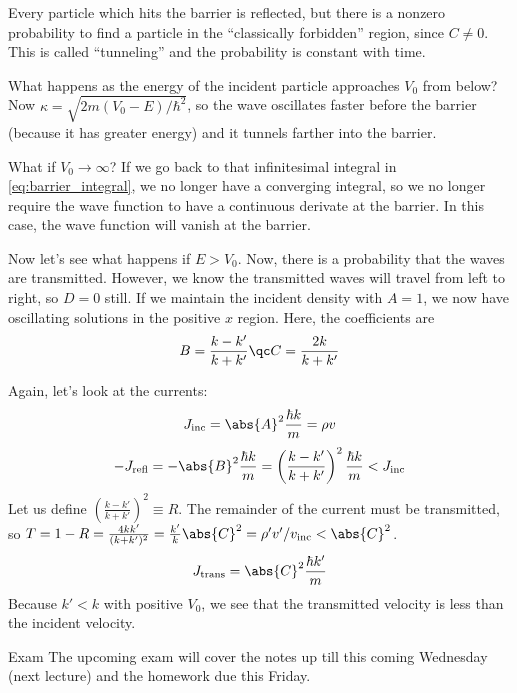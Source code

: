 \documentclass[a4paper,twoside,master.tex]{subfiles}
\begin{document}
Every particle which hits the barrier is reflected, but there is a nonzero probability to find a particle in the ``classically forbidden'' region, since $ C \neq 0 $. This is called ``tunneling'' and the probability is constant with time.

What happens as the energy of the incident particle approaches $ V_0 $ from below? Now $ \kappa = \sqrt{2m(V_0-E)/\hbar^2} $, so the wave oscillates faster before the barrier (because it has greater energy) and it tunnels farther into the barrier.

What if $ V_0 \to \infty $? If we go back to that infinitesimal integral in \cref{eq:barrier_integral}, we no longer have a converging integral, so we no longer require the wave function to have a continuous derivate at the barrier. In this case, the wave function will vanish at the barrier.

Now let's see what happens if $ E > V_0 $. Now, there is a probability that the waves are transmitted. However, we know the transmitted waves will travel from left to right, so $ D = 0 $ still. If we maintain the incident density with $ A = 1 $, we now have oscillating solutions in the positive $ x $ region. Here, the coefficients are
\begin{equation}
    B = \frac{k - k'}{k + k'} \qc C = \frac{2k}{k + k'}
\end{equation}

Again, let's look at the currents:
\begin{equation}
    J_{\text{inc}} = \abs{A}^2 \frac{\hbar k}{m} = \rho v
\end{equation}
\begin{equation}
    -J_{\text{refl}} = - \abs{B}^2 \frac{\hbar k}{m} = \left( \frac{k - k
    '}{k + k'} \right)^2 \frac{\hbar k}{m} < J_{\text{inc}}
\end{equation}
Let us define $ \left( \frac{k - k'}{k + k'} \right)^2 \equiv R $. The remainder of the current must be transmitted, so $ T = 1-R = \frac{4 k k'}{(k+k')^2} = \frac{k'}{k} \abs{C}^2 = \rho' v'/v_{\text{inc}} < \abs{C}^2 $. 
\begin{equation}
    J_{\text{trans}} = \abs{C}^2 \frac{\hbar k'}{m}
\end{equation}
Because $ k' < k $ with positive $ V_0 $, we see that the transmitted velocity is less than the incident velocity.

\begin{note}{Exam}
    The upcoming exam will cover the notes up till this coming Wednesday (next lecture) and the homework due this Friday.
\end{note}
\end{document}
